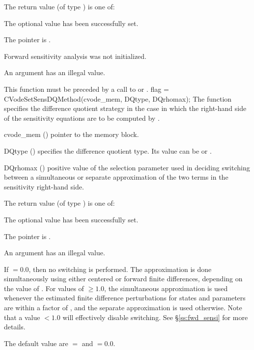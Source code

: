 {
  The return value  (of type ) is one of:
  \begin{args}
  \item[\Id{CV\_SUCCESS}] 
    The optional value has been successfully set.
  \item[\Id{CV\_MEM\_NULL}]
    The  pointer is .
  \item[\Id{CV\_NO\_SENS}]
    Forward sensitivity analysis was not initialized.
  \item[\Id{CV\_ILL\_INPUT}]
    An argument has an illegal value.
  \end{args}
}
{
  {\warn}This function must be preceded by a call to  or .
}
{
  flag = CVodeSetSensDQMethod(cvode\_mem, DQtype, DQrhomax);
}
{
  The function  specifies the difference quotient strategy in
  the case in which the right-hand side of the sensitivity equations are to
  be computed by {\cvodes}.
}
{
  \begin{args}
  \item[cvode\_mem] ()
    pointer to the {\cvodes} memory block.
  \item[DQtype] ()
    specifies the difference quotient type. Its value can be 
    or .
  \item[DQrhomax] ()
    positive value of the selection parameter used in deciding switching between a simultaneous
    or separate approximation of the two terms in the sensitivity right-hand side.
  \end{args}
}
{
  The return value  (of type ) is one of:
  \begin{args}
  \item[\Id{CV\_SUCCESS}]
    The optional value has been successfully set.
  \item[\Id{CV\_MEM\_NULL}]
    The  pointer is .
  \item[\Id{CV\_ILL\_INPUT}]
    An argument has an illegal value.
  \end{args}
}
{
  If  $= 0.0$, then no switching is performed. The approximation is done
  simultaneously using either centered or forward finite differences, depending on the
  value of .  For values of  $\ge 1.0$, the simultaneous
  approximation is used whenever the estimated finite difference perturbations for
  states and parameters are within a factor of , and the separate
  approximation is used otherwise. Note that a value  $< 1.0$ will
  effectively disable switching.   See \S\ref{ss:fwd_sensi} for more details.

  The default value are $=$ and $=0.0$. 
}
